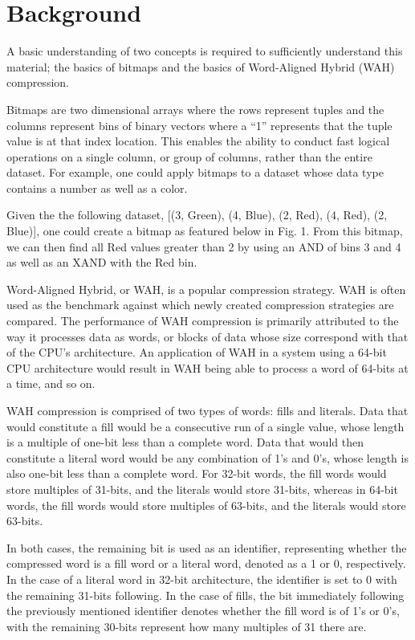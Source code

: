\documentclass{article}
\begin{document}
\section{Background}
\justify

A basic understanding of two concepts is required to sufficiently understand this material; the basics of bitmaps and the basics of Word-Aligned Hybrid (WAH) compression. \par

Bitmaps are two dimensional arrays where the rows represent tuples and the columns represent bins of binary vectors where a “1” represents that the tuple value is at that index location. This enables the ability to conduct fast logical operations on a single column, or group of columns, rather than the entire dataset. For example, one could apply bitmaps to a dataset whose data type contains a number as well as a color. \par

Given the the following dataset, [(3, Green), (4, Blue), (2, Red), (4, Red), (2, Blue)], one could create a bitmap as featured below in Fig. 1. From this bitmap, we can then find all Red values greater than 2 by using an AND of bins 3 and 4 as well as an XAND with the Red bin. \par


Word-Aligned Hybrid, or WAH, is a popular compression strategy. WAH is often used as the benchmark against which newly created compression strategies are compared. The performance of WAH compression is primarily attributed to the way it processes data as words, or blocks of data whose size correspond with that of the CPU's architecture. An application of WAH in a system using a 64-bit CPU architecture would result in WAH being able to process a word of 64-bits at a time, and so on.
\par 
WAH compression is comprised of two types of words: fills and literals. Data that would constitute a fill would be a consecutive run of a single value, whose length is a multiple of one-bit less than a complete word. Data that would then constitute a literal word would be any combination of 1's and 0's, whose length is also one-bit less than a complete word. For 32-bit words, the fill words would store multiples of 31-bits, and the literals would store 31-bits, whereas in 64-bit words, the fill words would store multiples of 63-bits, and the literals would store 63-bits. 
\par 
In both cases, the remaining bit is used as an identifier, representing whether the compressed word is a fill word or a literal word, denoted as a 1 or 0, respectively. In the case of a literal word in 32-bit architecture, the identifier is set to 0 with the remaining 31-bits following. In the case of fills, the bit immediately following the previously mentioned identifier denotes whether the fill word is of 1’s or 0’s, with the remaining 30-bits represent how many multiples of 31 there are. \par
\end{document}
